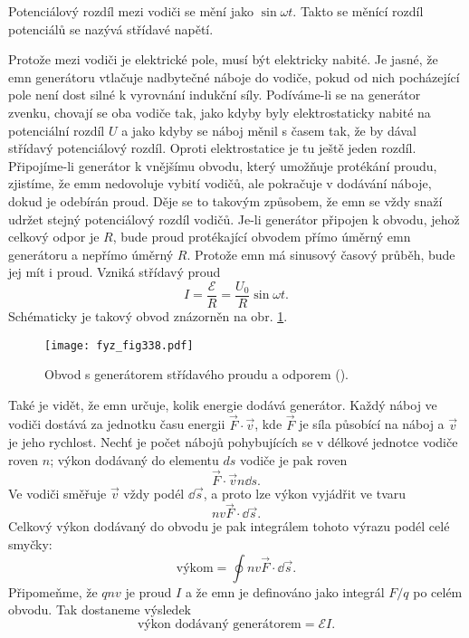   Potenciálový rozdíl mezi vodiči se mění jako \(\sin\omega t\). Takto se měnící rozdíl potenciálů 
  se nazývá střídavé napětí.
  
  Protože mezi vodiči je elektrické pole, musí být elektricky nabité. Je jasné, že emn generátoru 
  vtlačuje nadbytečné náboje do vodiče, pokud od nich pocházející pole není dost silné k vyrovnání 
  indukční síly. Podíváme-li se na generátor zvenku, chovají se oba vodiče tak, jako kdyby byly 
  elektrostaticky nabité na potenciální rozdíl \(U\) a jako kdyby se náboj měnil s časem tak, že by 
  dával střídavý potenciálový rozdíl. Oproti elektrostatice je tu ještě jeden rozdíl. Připojíme-li 
  generátor  k vnějšímu obvodu, který umožňuje protékání proudu, zjistíme, že emm nedovoluje vybití 
  vodičů, ale pokračuje v dodávání náboje, dokud je odebírán proud. Děje se to takovým způsobem, že 
  emn se vždy snaží udržet stejný potenciálový rozdíl vodičů. Je-li generátor připojen k obvodu, 
  jehož celkový odpor je \(R\), bude proud protékající obvodem přímo úměrný emn generátoru a 
  nepřímo úměrný \(R\). Protože emn má sinusový časový průběh, bude jej mít i proud. Vzniká 
  střídavý proud
  \begin{equation}\label{fyz:eq393}
    I = \frac{\mathscr{E}}{R}= \frac{U_0}{R}\sin\omega t.
  \end{equation}
  Schématicky je takový obvod znázorněn na obr. \ref{fyz:fig338}.

  \begin{figure}[ht!]  %
    \centering
    \texttt{[image: fyz\_fig338.pdf]}
    \caption{Obvod s generátorem střídavého proudu a odporem 
             (\cite[s.~302]{Feynman02}).}
    \label{fyz:fig338}
  \end{figure}
  
  Také je vidět, že emn určuje, kolik energie dodává generátor. Každý náboj ve vodiči dostává za 
  jednotku času energii \(\vec{F}\cdot\vec{v}\), kde \(\vec{F}\) je síla působící na náboj a 
  \(\vec{v}\) je jeho rychlost. Nechť je počet nábojů pohybujících se v délkové jednotce vodiče 
  roven \(n\); výkon dodávaný do elementu \(ds\) vodiče je pak roven
  \begin{equation}\label{fyz:eq394}
    \vec{F}\cdot\vec{v}n\dd{s}.
  \end{equation}
  Ve vodiči směřuje \(\vec{v}\) vždy podél \(\dd{\vec{s}}\), a proto lze výkon vyjádřit ve tvaru
  \begin{equation}\label{fyz:eq395}
    nv\vec{F}\cdot\dd{\vec{s}}.
  \end{equation}
  Celkový výkon dodávaný do obvodu je pak integrálem tohoto výrazu podél celé smyčky:
  \begin{equation}\label{fyz:eq396}
    \text{výkom} = \oint nv\vec{F}\cdot\dd{\vec{s}}.
  \end{equation}
  Připomeňme, že \(qnv\) je proud \(I\) a že emn je definováno jako integrál \(F/q\) po celém 
  obvodu. Tak dostaneme výsledek 
  \begin{equation}\label{fyz:eq397}
    \text{výkon dodávaný generátorem} = \mathscr{E}I.
  \end{equation}
  
